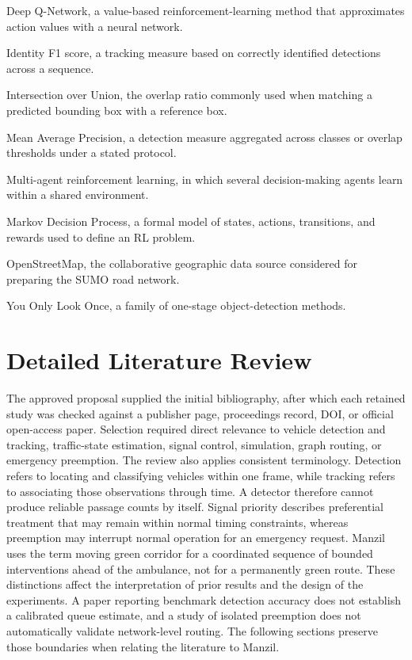 \begin{description}[font=\normalfont,leftmargin=0pt,labelindent=0pt,itemindent=0pt,labelsep=0.45em,itemsep=0.25\baselineskip,parsep=0pt,topsep=0.5\baselineskip]
\item[DQN:] Deep Q-Network, a value-based reinforcement-learning method that approximates action values with a neural network.
\item[IDF1:] Identity F1 score, a tracking measure based on correctly identified detections across a sequence.
\item[IoU:] Intersection over Union, the overlap ratio commonly used when matching a predicted bounding box with a reference box.
\item[mAP:] Mean Average Precision, a detection measure aggregated across classes or overlap thresholds under a stated protocol.
\item[MARL:] Multi-agent reinforcement learning, in which several decision-making agents learn within a shared environment.
\item[MDP:] Markov Decision Process, a formal model of states, actions, transitions, and rewards used to define an RL problem.
\item[OSM:] OpenStreetMap, the collaborative geographic data source considered for preparing the SUMO road network.
\item[YOLO:] You Only Look Once, a family of one-stage object-detection methods.
\end{description}

\section{Detailed Literature Review}

The approved proposal supplied the initial bibliography, after which each retained study was checked against a publisher page, proceedings record, DOI, or official open-access paper. Selection required direct relevance to vehicle detection and tracking, traffic-state estimation, signal control, simulation, graph routing, or emergency preemption. The review also applies consistent terminology. Detection refers to locating and classifying vehicles within one frame, while tracking refers to associating those observations through time. A detector therefore cannot produce reliable passage counts by itself. Signal priority describes preferential treatment that may remain within normal timing constraints, whereas preemption may interrupt normal operation for an emergency request. Manzil uses the term moving green corridor for a coordinated sequence of bounded interventions ahead of the ambulance, not for a permanently green route. These distinctions affect the interpretation of prior results and the design of the experiments. A paper reporting benchmark detection accuracy does not establish a calibrated queue estimate, and a study of isolated preemption does not automatically validate network-level routing. The following sections preserve those boundaries when relating the literature to Manzil.

